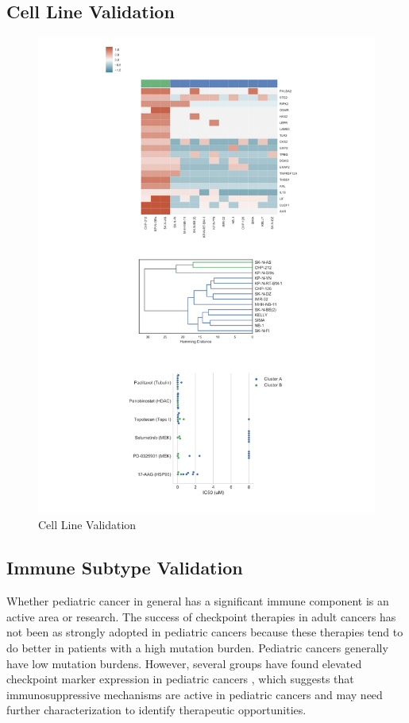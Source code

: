 \documentclass[fleqn,10pt]{wlscirep}
\begin{document}
\subsection{Cell Line Validation}
\begin{figure}
	\centering
	\includegraphics[width=0.75\linewidth]{images/rough-cell-line-validation.png}
	\caption{Cell Line Validation}
	\label{sfig:cellline}
\end{figure}

\subsection*{Immune Subtype Validation}
Whether pediatric cancer in general has a significant immune component is an active area or research. The success of checkpoint therapies in adult cancers has not been as strongly adopted in pediatric cancers because these therapies tend to do better in patients with a high mutation burden. Pediatric cancers generally have low mutation burdens. However, several groups have found elevated checkpoint marker expression in pediatric cancers \cite{majzner2017assessment,saletta2017programmed,nowicki2016prospective}, which suggests that immunosuppressive mechanisms are active in pediatric cancers and may need further characterization to identify therapeutic opportunities. 
\end{document}
